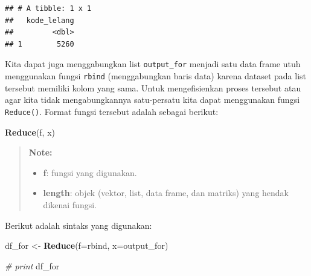 \documentclass[]{book}
\newenvironment{Shaded}{\begin{snugshade}}{\end{snugshade}}
\newcommand{\KeywordTok}[1]{\textcolor[rgb]{0.13,0.29,0.53}{\textbf{#1}}}
\newcommand{\DataTypeTok}[1]{\textcolor[rgb]{0.13,0.29,0.53}{#1}}
\newcommand{\StringTok}[1]{\textcolor[rgb]{0.31,0.60,0.02}{#1}}
\newcommand{\CommentTok}[1]{\textcolor[rgb]{0.56,0.35,0.01}{\textit{#1}}}
\newcommand{\NormalTok}[1]{#1}
\providecommand{\tightlist}{%
  \setlength{\itemsep}{0pt}\setlength{\parskip}{0pt}}
\begin{document}
\begin{verbatim}
## # A tibble: 1 x 1
##   kode_lelang
##         <dbl>
## 1        5260
\end{verbatim}

Kita dapat juga menggabungkan list \texttt{output\_for} menjadi satu
data frame utuh menggunakan fungsi \texttt{rbind} (menggabungkan baris
data) karena dataset pada list tersebut memiliki kolom yang sama. Untuk
mengefisienkan proses tersebut atau agar kita tidak mengabungkannya
satu-persatu kita dapat menggunakan fungsi \texttt{Reduce()}. Format
fungsi tersebut adalah sebagai berikut:

\begin{Shaded}
\begin{Highlighting}[]
\KeywordTok{Reduce}\NormalTok{(f, x)}
\end{Highlighting}
\end{Shaded}

\begin{quote}
\textbf{Note: }

\begin{itemize}
\tightlist
\item
  \textbf{f}: fungsi yang digunakan.
\item
  \textbf{length}: objek (vektor, list, data frame, dan matriks) yang
  hendak dikenai fungsi.
\end{itemize}
\end{quote}

Berikut adalah sintaks yang digunakan:

\begin{Shaded}
\begin{Highlighting}[]
\NormalTok{df_for <-}\StringTok{ }\KeywordTok{Reduce}\NormalTok{(}\DataTypeTok{f=}\NormalTok{rbind, }\DataTypeTok{x=}\NormalTok{output_for)}

\CommentTok{# print}
\NormalTok{df_for}
\end{Highlighting}
\end{Shaded}
\end{document}
